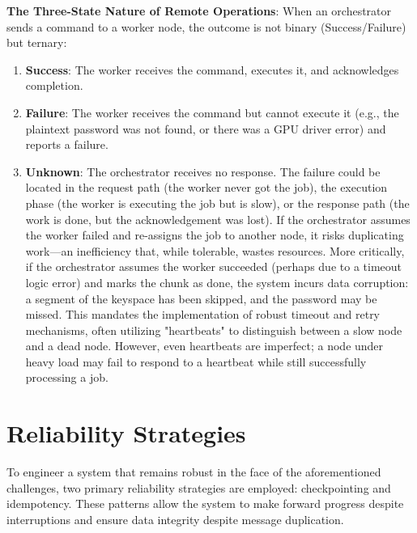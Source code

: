 \textbf{The Three-State Nature of Remote Operations}: When an orchestrator sends a command to a worker node, the outcome is not binary (Success/Failure) but ternary:

\begin{enumerate}
    \item \textbf{Success}: The worker receives the command, executes it, and acknowledges completion.

    \item \textbf{Failure}: The worker receives the command but cannot execute it (e.g., the plaintext password was not found, or there was a GPU driver error) and reports a failure.

    \item \textbf{Unknown}: The orchestrator receives no response. The failure could be located in the request path (the worker never got the job), the execution phase (the worker is executing the job but is slow), or the response path (the work is done, but the acknowledgement was lost). If the orchestrator assumes the worker failed and re-assigns the job to another node, it risks duplicating work—an inefficiency that, while tolerable, wastes resources. More critically, if the orchestrator assumes the worker succeeded (perhaps due to a timeout logic error) and marks the chunk as done, the system incurs data corruption: a segment of the keyspace has been skipped, and the password may be missed. This mandates the implementation of robust timeout and retry mechanisms, often utilizing "heartbeats" to distinguish between a slow node and a dead node. However, even heartbeats are imperfect; a node under heavy load may fail to respond to a heartbeat while still successfully processing a job.
\end{enumerate}

\section{Reliability Strategies}

To engineer a system that remains robust in the face of the aforementioned challenges, two primary reliability strategies are employed: checkpointing and idempotency. These patterns allow the system to make forward progress despite interruptions and ensure data integrity despite message duplication.

